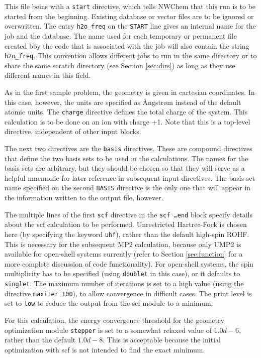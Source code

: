 This file beins with a {\tt start} directive, which tells NWChem that this 
run is to be started from the beginning. Existing database or vector files 
are to be ignored or overwritten. The entry \verb+h2o_freq+ on the 
\verb+START+ line gives an internal name for the job and the database.  
The name used for each temporary or permanent file
created bby the code that is associated with the
job will also contain the string \verb+h2o_freq+. 
This convention allows
different jobs to run in the same directory or to share the same
scratch directory (see Section \ref{sec:dirs}) as long as they
use different names in this field.

As in the first sample problem, the geometry is given in cartesian 
coordinates.  In this case, however, the units are specified as
{\AA}ngstr{\o}m instead of the default atomic units.
The {\tt charge} directive defines the total charge of the system.  
This calculation is to be done on an ion with charge +1. Note that this is a top-level
directive, independent of other input blocks.

The next two directives are the {\tt basis} directives.  These are compound
directives that define the two basis sets to be used in the calculations.  
The names for the basis sets are arbitrary, but they should be 
chosen so that they will serve as a helpful mnemonic 
for later reference in
subsequent input directives.  The basis set name specified on the second 
\verb+BASIS+ directive is the only one that will appear in the information
written to the output file, however.

The multiple lines of the first {\tt scf} directive in the {\tt scf \ldots end} 
block specify 
details about the scf
calculation to be performed. Unrestricted Hartree-Fock is chosen
here (by specifying the keyword {\tt uhf}),
rather than the default high-spin ROHF. This is necessary for 
the subsequent MP2
calculation, because only UMP2 is available for
open-shell systems currently (refer to Section \ref{sec:function} for
a more complete discussion of code functionality). For open-shell 
systems, the spin multiplicity has to be specified (using {\tt doublet}
in this case),
or it defaults to {\tt singlet}. The maximum
number of iterations is set to a high value
(using the directive \verb+maxiter 100+), to allow convergence in
difficult cases. The print level is set to {\tt low} to reduce the
output from the scf module to a minimum.

For this calculation, the energy convergence threshold for the 
geometry optimization module
{\tt stepper} is set to a somewhat relaxed value of $1.0d-6$, rather
than the default $1.0d-8$.  This is acceptable
because the initial optimization with scf is not intended to find the
exact minimum.

